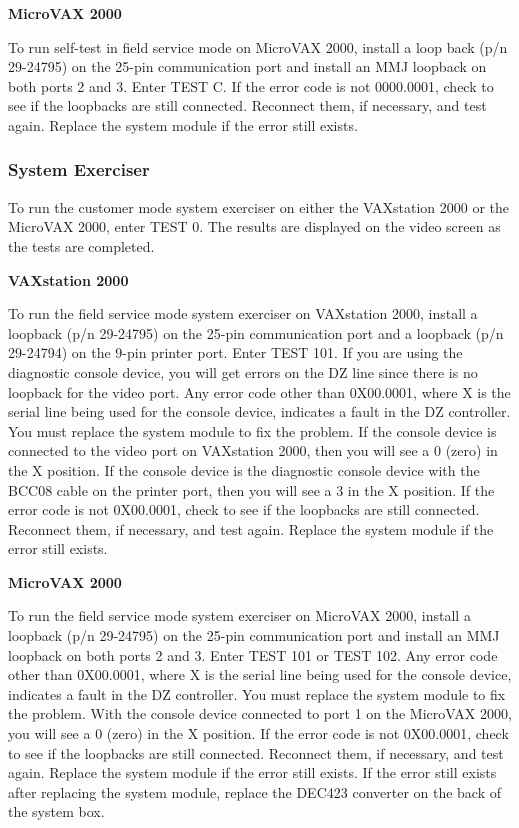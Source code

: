 \textbf{MicroVAX 2000}

To run self-test in field service mode on MicroVAX 2000, install a loop
back (p/n 29-24795) on the 25-pin communication port and install an MMJ
loopback on both ports 2 and 3. Enter TEST C. If the error code is not
0000.0001, check to see if the loopbacks are still connected. Reconnect
them, if necessary, and test again. Replace the system module if the error
still exists.

\subsubsection{System Exerciser}

To run the customer mode system exerciser on either the VAXstation 2000
or the MicroVAX 2000, enter TEST 0. The results are displayed on the video
screen as the tests are completed.

\textbf{VAXstation 2000}

To run the field service mode system exerciser on VAXstation 2000, install a
loopback (p/n 29-24795) on the 25-pin communication port and a loopback
(p/n 29-24794) on the 9-pin printer port. Enter TEST 101. If you are using the
diagnostic console device, you will get errors on the DZ line since there is
no loopback for the video port. Any error code other than 0X00.0001, where
X is the serial line being used for the console device, indicates a fault in
the DZ controller. You must replace the system module to fix the problem.
If the console device is connected to the video port on VAXstation 2000,
then you will see a 0 (zero) in the X position. If the console device is the
diagnostic console device with the BCC08 cable on the printer port, then
you will see a 3 in the X position. If the error code is not 0X00.0001, check
to see if the loopbacks are still connected. Reconnect them, if necessary,
and test again. Replace the system module if the error still exists.

\textbf{MicroVAX 2000}

To run the field service mode system exerciser on MicroVAX 2000, install
a loopback (p/n 29-24795) on the 25-pin communication port and install an
MMJ loopback on both ports 2 and 3. Enter TEST 101 or TEST 102. Any
error code other than 0X00.0001, where X is the serial line being used for
the console device, indicates a fault in the DZ controller. You must replace
the system module to fix the problem. With the console device connected to
port 1 on the MicroVAX 2000, you will see a 0 (zero) in the X position. If the
error code is not 0X00.0001, check to see if the loopbacks are still connected.
Reconnect them, if necessary, and test again. Replace the system module
if the error still exists. If the error still exists after replacing the system
module, replace the DEC423 converter on the back of the system box.

